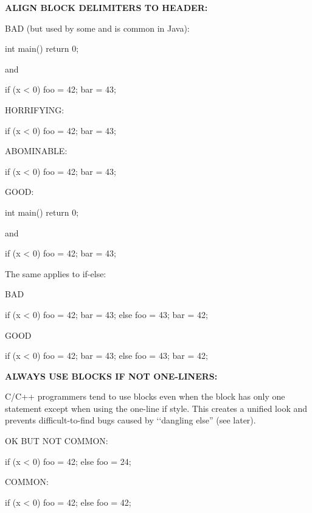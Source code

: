 \textbf{ALIGN BLOCK DELIMITERS TO HEADER:}

BAD (but used by some and is common in Java):
\begin{console}
int main() {
    return 0;
}  
\end{console}
and\\
\begin{console}
if (x < 0) {
   foo = 42;
   bar = 43;
} 
\end{console}

HORRIFYING:\\
\begin{console}
if (x < 0)
   {
   foo = 42;
   bar = 43;
   } 
\end{console}

ABOMINABLE:
\begin{console}
if (x < 0)
   {
        foo = 42;
        bar = 43;
   } 
\end{console}

GOOD:
\begin{console}
int main()
{
    return 0;
}  
\end{console}

and
\begin{console}
if (x < 0)
{
    foo = 42;
    bar = 43;
} 
\end{console}

The same applies to if-else:

BAD
\begin{console}
if (x < 0) {
    foo = 42;
    bar = 43;
}
else {
    foo = 43;
    bar = 42;
}
\end{console}
GOOD
\begin{console}
if (x < 0)
{  
    foo = 42;
    bar = 43;
}
else
{       
    foo = 43;
    bar = 42;
}
\end{console}

\textbf{ALWAYS USE BLOCKS IF NOT ONE-LINERS:}

C/C++ programmers tend to use blocks even when the block has only one
statement except when using the one-line if style. This creates a
unified look and prevents difficult-to-find bugs caused by \lq\lq dangling
else'' (see later).

OK BUT NOT COMMON:
\begin{console}
if (x < 0)
   foo = 42;
else
   foo = 24; 
\end{console}

COMMON:
\begin{console}
if (x < 0)
{
    foo = 42;
}
else
{
    foo = 42;
}
\end{console}
\newpage{}

